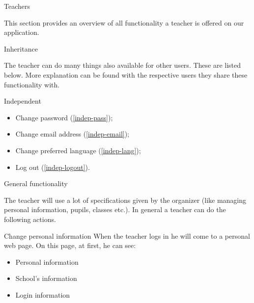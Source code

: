 
\begin{section}{Teachers}

    This section provides an overview of all functionality a teacher is offered
    on our application.

    \begin{subsection}{Inheritance}

        The teacher can do many things also available for other users. These are
        listed below. More explanation can be found with the respective users
        they share these functionality with.

        \begin{subsubsection}{Independent}

            \begin{itemize}
                \item Change password           (\ref{indep-pass});
                \item Change email address      (\ref{indep-email});
                \item Change preferred language (\ref{indep-lang});
                \item Log out                   (\ref{indep-logout}).
            \end{itemize}

        \end{subsubsection}

    \end{subsection}

    \begin{subsection}{General functionality}

        The teacher will use a lot of specifications given by the organizer
        (like managing personal information, pupils, classes etc.). In general a
        teacher can do the following actions.

        \begin{subsubsection}{Change personal information}
            When the teacher logs in he will come to a personal web page. On
            this page, at first, he can see:

            \begin{itemize}
                \item Personal information
                \item School's information
                \item Login information
            \end{itemize}


\end{subsubsection}
\end{subsection}
\end{section}
